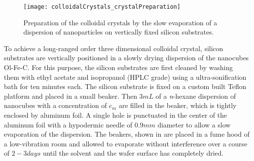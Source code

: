 \documentclass[\main/dresen_thesis.tex]{subfiles}
\begin{document}
  \begin{figure}[tb]
    \centering
    \texttt{[image: colloidalCrystals\_crystalPreparation]}
    \caption{\label{fig:colloidalCrystals:preparation:image}Preparation of the colloidal crystals by the slow evaporation of a dispersion of nanoparticles on vertically fixed silicon substrates.}
  \end{figure}

  To achieve a long-ranged order three dimensional colloidal crystal, silicon substrates are vertically positioned in a slowly drying dispersion of the nanocubes Ol-Fe-C.
  For this purpose, the silicon substrates are first cleaned by washing them with ethyl acetate and isopropanol (HPLC grade) using a ultra-sonification bath for ten minutes each.
  The silicon substrate is fixed on a custom built Teflon platform and placed in a small beaker.
  Then $3 \unit{mL}$ of a \textit{n}-hexane dispersion of nanocubes with a concentration of $c_m$ are filled in the beaker, which is tightly enclosed by aluminum foil.
  A single hole is punctuated in the center of the aluminum foil with a hypodermic needle of $0.9 \unit{mm}$ diameter to allow a slow evaporation of the dispersion.
  The beakers, shown in  are placed in a fume hood of a low-vibration room and allowed to evaporate without interference over a course of $2 - 3 \unit{days}$ until the solvent and the wafer surface has completely dried.
\end{document}
